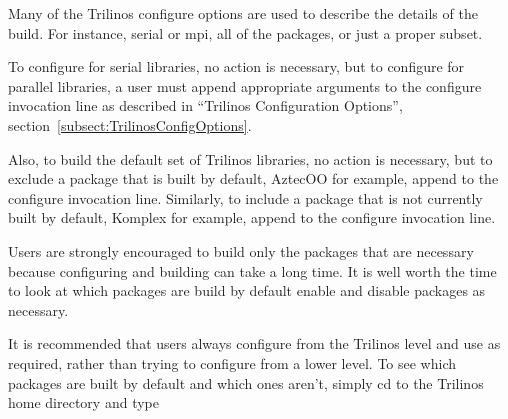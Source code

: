 Many of the Trilinos configure options are used to describe the details of the 
build.  For 
instance, serial or mpi, all of the packages, or just a proper subset.  

To configure for serial libraries, no action is necessary,
but to configure for parallel libraries, a user must append appropriate 
arguments to the configure invocation line as described in ``Trilinos 
Configuration Options'', section~\ref{subsect:TrilinosConfigOptions}.

Also, to build the default set of Trilinos libraries, no action is 
necessary, but to exclude a package that is built by default, AztecOO for 
example, append \newline {} to the configure 
invocation  line.  Similarly, to include a package that is not currently built 
by default, Komplex for example, append  to 
the configure invocation line.  

\begin{minipage}[c]{\textwidth}
\begin{minipage}[l]{.6\textwidth}

Users are strongly encouraged to build 
only the packages that are necessary because configuring and 
building can take a long time.  It is well worth the time to look at which
packages are build by default enable and disable packages as necessary.
\end{minipage}\hfill
{}
\end{minipage}

It is recommended that users always configure 
from the Trilinos level and use  as 
required, rather than trying to configure from a lower level.  To see which 
packages are built by default and which ones aren't, simply cd to the Trilinos home directory and type 


